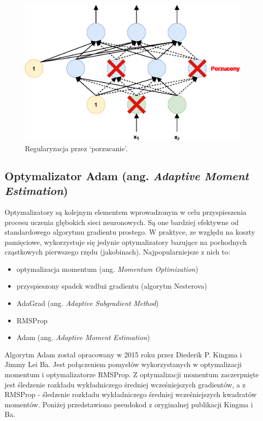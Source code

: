 \documentclass[a4paper,11pt]{article}
\begin{document}
    \begin{figure}[H]
        \label{fig:dropout}
        \centering
        \includegraphics[width=\textwidth]{dropout}
        \caption{Regularyzacja przez `porzucanie'\cite{UczenieMaszynowe2018}.}
    \end{figure}

    \subsection{Optymalizator Adam (ang. \textit{Adaptive Moment Estimation})}

    Optymalizatory są kolejnym elementem wprowadzonym w celu przyspieszenia procesu uczenia głębokich sieci neuronowych. Są one bardziej efektywne od standardowego algorytmu gradientu prostego. W praktyce, ze względu na koszty pamięciowe, wykorzystuje się jedynie optymalizatory bazujące na pochodnych cząstkowych pierwszego rzędu (jakobinach)\cite{UczenieMaszynowe2018}. Najpopularniejsze z nich to:
    \begin{itemize}
        \item optymalizacja momentum (ang. \textit{Momentum Optimization})
        \item przyspieszony spadek wzdłuż gradientu (algorytm Nesterova)
        \item AdaGrad (ang. \textit{Adaptive Subgradient Method})
        \item RMSProp
        \item Adam (ang. \textit{Adaptive Moment Estimation})
    \end{itemize}

    \bigskip

    Algorytm Adam został opracowany w 2015 roku przez Diederik P. Kingma i Jimmy Lei Ba\cite{AdamOptimization2015}. Jest połączeniem pomysłów wykorzystanych w optymalizacji momentum i optymalizatorze RMSProp. Z optymalizacji momentum zaczerpnięte jest śledzenie rozkładu wykładniczego średniej wcześniejszych gradientów, a z RMSProp - śledzenie rozkładu wykładniczego średniej wcześniejszych kwadratów momentów\cite{UczenieMaszynowe2018}. Poniżej przedstawiono pseudokod z oryginalnej publikacji Kingma i Ba.
\end{document}

